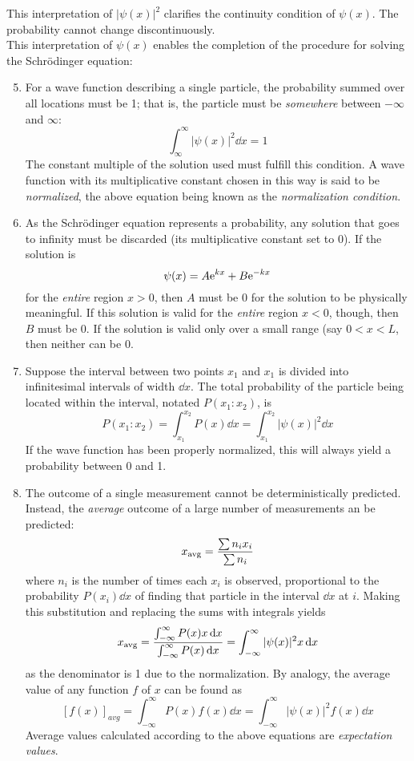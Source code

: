 \documentclass{subfiles}
\begin{document}
			This interpretation of \(|\psi(x)|^2\) clarifies the continuity condition of \(\psi(x)\). The probability cannot change discontinuously. \\
			This interpretation of \(\psi(x)\) enables the completion of the procedure for solving the Schr\"odinger equation:
			\begin{enumerate}
				\setcounter{enumi}{4}
				\item
					For a wave function describing a single particle, the probability summed over all locations must be 1; that is, the particle must be \textit{somewhere} between \(-\infty\) and \(\infty\):
					\[\int_{\infty}^\infty |\psi(x)|^2 \dd{x} = 1\]
					The constant multiple of the solution used must fulfill this condition. A wave function with its multiplicative constant chosen in this way is said to be \textit{normalized}, the above equation being known as the \textit{normalization condition}.
				\item
					As the Schr\"odinger equation represents a probability, any solution that goes to infinity must be discarded (its multiplicative constant set to 0). If the solution is
						\[\psi(x) = A\text{e}^{kx} + B\text{e}^{-kx}\]
						for the \textit{entire} region \(x > 0\), then \(A\) must be 0 for the solution to be physically meaningful. If this solution is valid for the \textit{entire} region \(x < 0\), though, then \(B\) must be 0. If the solution is valid only over a small range (say \(0 < x < L\), then neither can be 0.
				\item
					Suppose the interval between two points \(x_1\) and \(x_1\) is divided into infinitesimal intervals of width \(\dd{x}\). The total probability of the particle being located within the interval, notated \(P(x_1:x_2)\), is 
						\[
							P(x_1:x_2) = \int_{x_1}^{x_2} P(x) \dd{x}
								= \int_{x_1}^{x_2} |\psi(x)|^2 \dd{x}
						\]
						If the wave function has been properly normalized, this will always yield a probability between 0 and 1.
				\item
					The outcome of a single measurement cannot be deterministically predicted. Instead, the \textit{average} outcome of a large number of measurements an be predicted:
						\[x_{\text{avg}} = \frac{\sum n_ix_i}{\sum n_i}\]
						where \(n_i\) is the number of times each \(x_i\) is observed, proportional to the probability \(P(x_i)\dd{x}\) of finding that particle in the interval \(\dd{x}\) at \(i\). Making this substitution and replacing the sums with integrals yields
						\[
							x_{\text{avg}} = \frac{\int_{-\infty}^\infty P(x)x \dd{x}}{\int_{-\infty}^\infty P(x) \dd{x}}
								= \int_{-\infty}^\infty |\psi(x)|^2x \dd{x}
						\]
						as the denominator is 1 due to the normalization. By analogy, the average value of any function \(f\) of \(x\) can be found as
						\[
							[f(x)]_{avg} = \int_{-\infty}^\infty P(x)f(x) \dd{x}
								= \int_{-\infty}^\infty |\psi(x)|^2f(x) \dd{x}
						\]
						Average values calculated according to the above equations are \textit{expectation values}.
			\end{enumerate}
\end{document}
